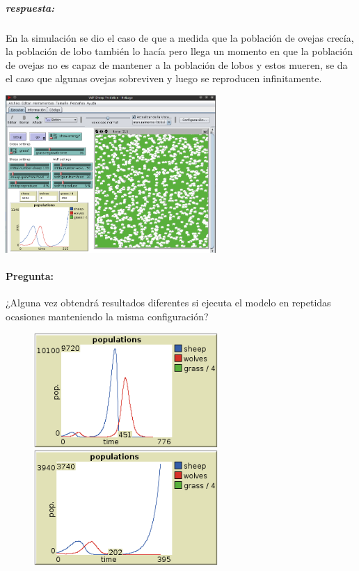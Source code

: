 \documentclass[12pt,letterpaper]{article}
\begin{document}
\begin{itemize}
		\subparagraph{respuesta:}
			En la simulación se dio el caso de que a medida que la población de ovejas crecía, la población de lobo también lo hacía pero llega un momento en que la población de ovejas no es capaz de mantener a la población de lobos y estos mueren, se da el caso que algunas ovejas sobreviven y luego se reproducen infinitamente.
			\begin{center}
				\includegraphics[width=8cm]{./imagenes/image2.png}
			\end{center}

	\paragraph{Pregunta:}
	¿Alguna vez obtendrá resultados diferentes si ejecuta el modelo en repetidas ocasiones manteniendo la misma configuración?
	
	\begin{figure}
	\centering
		\begin{minipage}{.5\textwidth}
			\centering
			\includegraphics[width=7cm]{./imagenes/image3.png}
		\end{minipage}%
		\begin{minipage}{.5\textwidth}
  			\centering
  			\includegraphics[width=7cm]{./imagenes/image4.png}
		\end{minipage}
	\end{figure}


\end{itemize}
\end{document}
